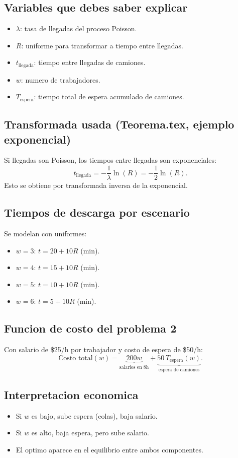 \documentclass[12pt,a4paper]{article}
\begin{document}
\subsection{Variables que debes saber explicar}
\begin{itemize}
  \item $\lambda$: tasa de llegadas del proceso Poisson.
  \item $R$: uniforme para transformar a tiempo entre llegadas.
  \item $t_{\text{llegada}}$: tiempo entre llegadas de camiones.
  \item $w$: numero de trabajadores.
  \item $T_{\text{espera}}$: tiempo total de espera acumulado de camiones.
\end{itemize}

\subsection{Transformada usada (Teorema.tex, ejemplo exponencial)}
Si llegadas son Poisson, los tiempos entre llegadas son exponenciales:
\[
t_{\text{llegada}}=-\frac{1}{\lambda}\ln(R)=-\frac{1}{2}\ln(R).
\]
Esto se obtiene por transformada inversa de la exponencial.

\subsection{Tiempos de descarga por escenario}
Se modelan con uniformes:
\begin{itemize}
  \item $w=3$: $t=20+10R$ (min).
  \item $w=4$: $t=15+10R$ (min).
  \item $w=5$: $t=10+10R$ (min).
  \item $w=6$: $t=5+10R$ (min).
\end{itemize}

\subsection{Funcion de costo del problema 2}
Con salario de \$25/h por trabajador y costo de espera de \$50/h:
\[
\text{Costo total}(w)=\underbrace{200w}_{\text{salarios en 8h}}+\underbrace{50\,T_{\text{espera}}(w)}_{\text{espera de camiones}}.
\]

\subsection{Interpretacion economica}
\begin{itemize}
  \item Si $w$ es bajo, sube espera (colas), baja salario.
  \item Si $w$ es alto, baja espera, pero sube salario.
  \item El optimo aparece en el equilibrio entre ambos componentes.
\end{itemize}
\end{document}
